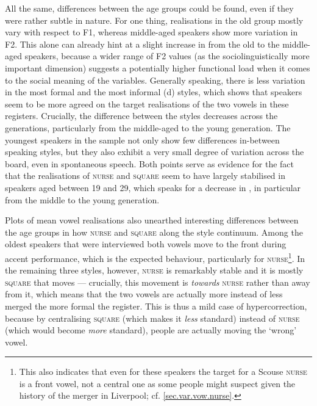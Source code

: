 All the same, differences between the age groups could be found, even if they were rather subtle in nature.
For one thing, realisations in the old group mostly vary with respect to F1, whereas middle-aged speakers show more variation in F2.
This alone can already hint at a slight increase in  from the old to the middle-aged speakers, because a wider range of F2 values (as the sociolinguistically more important dimension) suggests a potentially higher functional load when it comes to the social meaning of the variables.
Generally speaking, there is less variation in the most formal and the most informal (d) styles, which shows that speakers seem to be more agreed on the target realisations of the two vowels in these registers.
Crucially, the difference between the styles decreases across the generations, particularly from the middle-aged to the young generation.
The youngest speakers in the sample not only show few differences in-between speaking styles, but they also exhibit a very small degree of variation across the board, even in spontaneous speech.
Both points serve as evidence for the fact that the realisations of \textsc{nurse} and \textsc{square} seem to have largely stabilised in speakers aged between 19 and 29, which speaks for a decrease in , in particular from the middle to the young generation.

Plots of mean vowel realisations also unearthed interesting differences between the age groups in how \textsc{nurse} and \textsc{square}  along the style continuum.
Among the oldest speakers that were interviewed both vowels move to the front during accent performance, which is the expected behaviour, particularly for \textsc{nurse}\footnote{This also indicates that even for these speakers the target for a Scouse \textsc{nurse} is a front vowel, not a central one as some people might suspect given the history of the merger in Liverpool; cf. \ref{sec.var.vow.nurse}.}.
In the remaining three styles, however, \textsc{nurse} is remarkably stable and it is mostly \textsc{square} that moves --- crucially, this movement is \emph{towards} \textsc{nurse} rather than away from it, which means that the two vowels are actually more instead of less merged the more formal the register.
This is thus a mild case of hypercorrection, because by centralising \textsc{square} (which makes it \emph{less} standard) instead of \textsc{nurse} (which would become \emph{more} standard), people are actually moving the `wrong' vowel.

